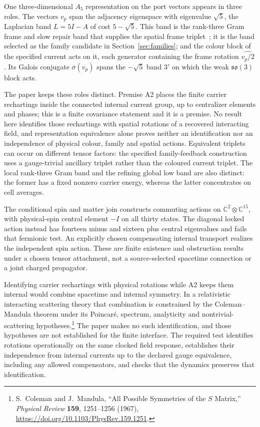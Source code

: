 \documentclass[11pt]{article}
\begin{document}
One three-dimensional \(A_5\) representation on the port vectors appears in
three roles. The vectors \(v_p\) span the adjacency eigenspace with
eigenvalue \(\sqrt5\), the Laplacian band \(L=5I-A\) of cost \(5-\sqrt5\).
This band is the rank-three Gram frame and slow repair band that supplies the
spatial frame triplet~\cite{ophmicrophysics,ophEinstein}; it is the band selected as the
family candidate in Section~\ref{sec:families}; and the colour block of the
specified current acts on it, each generator containing the frame rotation
\(\widehat{v_p/2}\). Its Galois conjugate \(\sigma(v_p)\) spans the
\(-\sqrt5\) band \(3'\) on which the weak \(\mathfrak{so}(3)\) block acts.

The paper keeps these roles distinct. Premise A2 places the finite carrier
rechartings inside the connected internal current group, up to centralizer
elements and phases; this is a finite covariance statement and it is a
premise. No result here identifies those
rechartings with spatial rotations of a recovered interacting field, and
representation equivalence alone proves neither an identification nor an
independence of physical colour, family and spatial actions. Equivalent
triplets can occur on different tensor factors: the specified family-feedback
construction uses a gauge-trivial ancillary triplet rather than the coloured
current triplet. The local rank-three Gram band and the refining global low
band are also distinct: the former has a fixed nonzero carrier energy,
whereas the latter concentrates on cell averages.

The conditional spin and matter join constructs commuting actions on
\(\mathbb C^2\otimes\mathbb C^{15}\), with physical-spin central element
\(-I\) on all thirty states. The diagonal locked action instead has fourteen
minus and sixteen plus central eigenvalues and fails that fermionic test. An
explicitly chosen compensating internal transport realizes the independent
spin action. These are finite existence and obstruction results under a
chosen tensor attachment, not a source-selected spacetime connection or a
joint charged propagator.

Identifying carrier rechartings with physical rotations while A2 keeps them
internal would combine spacetime and internal symmetry. In a relativistic
interacting scattering theory that combination is constrained by the
Coleman--Mandula theorem under its Poincar\'e, spectrum, analyticity and
nontrivial-scattering hypotheses.\footnote{S.~Coleman and J.~Mandula,
``All Possible Symmetries of the \(S\) Matrix,'' \emph{Physical Review}
\textbf{159}, 1251--1256 (1967),
\url{https://doi.org/10.1103/PhysRev.159.1251}.} The paper makes no such
identification, and those hypotheses are not established for the finite
interface. The required test identifies rotations operationally on the same
clocked field response, establishes their independence from internal
currents up to the declared gauge equivalence, including any allowed
compensators, and checks that the dynamics preserves that identification.
\end{document}
